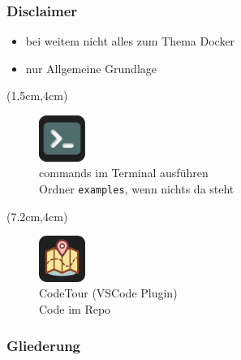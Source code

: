 \documentclass[22pt]{beamer}
\newcommand{\code}[1]{\colorbox{gray!10}{\texttt{#1}}}
\begin{document}
\begin{frame}[t]
    \frametitle{Disclaimer}
    \begin{itemize}
        \item bei weitem nicht alles zum Thema Docker
        \item nur Allgemeine Grundlage
    \end{itemize}

    \begin{textblock*}{4.5cm}(1.5cm,4cm) %
        \begin{figure}
            \includegraphics[width=1.5cm]{Bilder/terminal2.png}
            \captionsetup{justification=centering}
            \caption*{commands im Terminal ausführen\\ Ordner \code{examples}, wenn nichts da steht}
        \end{figure}

    \end{textblock*}

    \begin{textblock*}{4.5cm}(7.2cm,4cm) %
        \begin{figure}
            \includegraphics[width=1.5cm]{Bilder/CodeTour.png}
            \centering
            \captionsetup{justification=centering}
            \caption*{CodeTour (VSCode Plugin)\\Code im Repo}
        \end{figure}
    
    \end{textblock*}

\end{frame}

\begin{frame}[plain]
    \frametitle{Gliederung}
    \tableofcontents
\end{frame}
\end{document}
